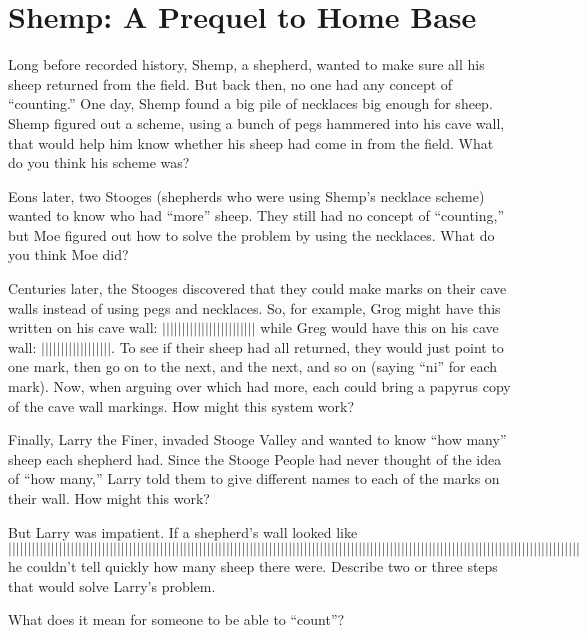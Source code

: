 \newpage
\section{Shemp: A Prequel to Home Base}\label{A:shemp}

\begin{prob}
Long before recorded history, Shemp, a shepherd, wanted to make sure all his sheep returned from the field.  But back then, no one had any concept of ``counting.''  One day, Shemp found a big pile of necklaces big enough for sheep.  Shemp figured out a scheme, using a bunch of pegs hammered into his cave wall, that would help him know whether his sheep had come in from the field.  What do you think his scheme was?
\end{prob}

\begin{prob}
Eons later, two Stooges (shepherds who were using Shemp's necklace scheme) wanted to know who had ``more'' sheep.  They still had no concept of ``counting,'' but Moe figured out how to solve the problem by using the necklaces.  What do you think Moe did?
\end{prob}

\begin{prob}
Centuries later, the Stooges discovered that they could make marks on their cave walls instead of using pegs and necklaces.  So, for example, Grog might have this written on his cave wall:  $||||||||||||||||||||||||$ while Greg would have this on his cave wall:  $||||||||||||||||||$.  To see if their sheep had all returned, they would just point to one mark, then go on to the next, and the next, and so on (saying ``ni'' for each mark).  Now, when arguing over which had more, each could bring a papyrus copy of the cave wall markings.  How might this system work?
\end{prob}

\begin{prob}
Finally, Larry the Finer, invaded Stooge Valley and wanted to know ``how many'' sheep each shepherd had.  Since the Stooge People had never thought of the idea of ``how many,'' Larry told them to give different names to each of the marks on their wall.  How might this work?  
\end{prob}

\begin{prob}
But Larry was impatient.  If a shepherd's wall looked like $$|||||||||||||||||||||||||||||||||||||||||||||||||||||||||||||||||||||||||||||||||||||||||||||||||||||||||||||||||||||||||||||||||||||||||||||||||||$$
he couldn't tell quickly how many sheep there were.   Describe two or three steps that would solve Larry's problem.   
\end{prob}

\begin{prob}
What does it mean for someone to be able to ``count''?
\end{prob}

